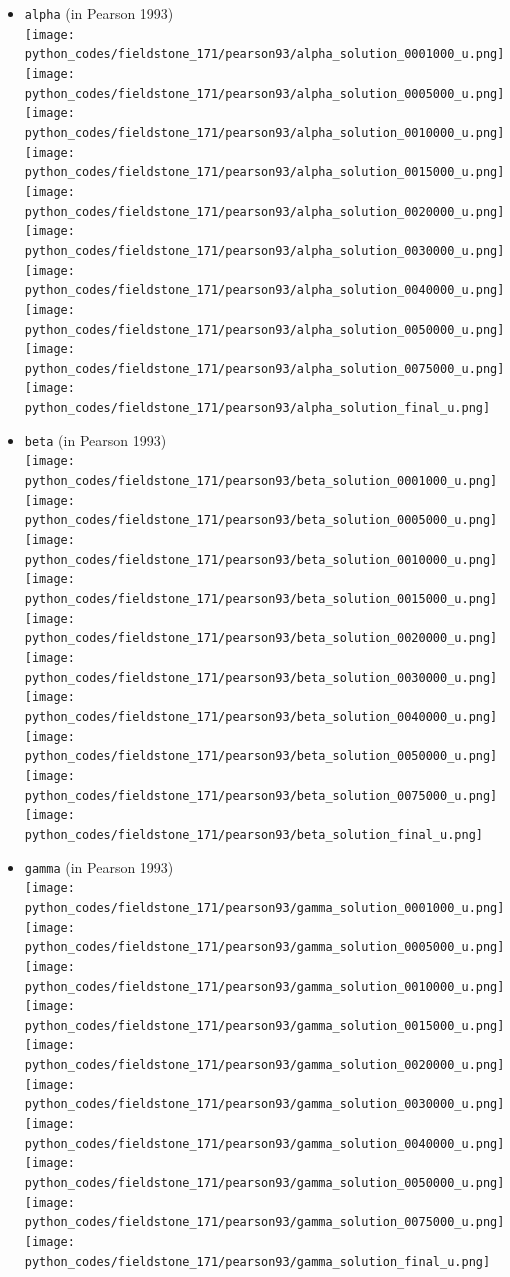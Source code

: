 \begin{itemize}
\item {\tt alpha} (in Pearson 1993)\\
\texttt{[image: python\_codes/fieldstone\_171/pearson93/alpha\_solution\_0001000\_u.png]}
\texttt{[image: python\_codes/fieldstone\_171/pearson93/alpha\_solution\_0005000\_u.png]}
\texttt{[image: python\_codes/fieldstone\_171/pearson93/alpha\_solution\_0010000\_u.png]}
\texttt{[image: python\_codes/fieldstone\_171/pearson93/alpha\_solution\_0015000\_u.png]}
\texttt{[image: python\_codes/fieldstone\_171/pearson93/alpha\_solution\_0020000\_u.png]}
\texttt{[image: python\_codes/fieldstone\_171/pearson93/alpha\_solution\_0030000\_u.png]}
\texttt{[image: python\_codes/fieldstone\_171/pearson93/alpha\_solution\_0040000\_u.png]}
\texttt{[image: python\_codes/fieldstone\_171/pearson93/alpha\_solution\_0050000\_u.png]}
\texttt{[image: python\_codes/fieldstone\_171/pearson93/alpha\_solution\_0075000\_u.png]}
\texttt{[image: python\_codes/fieldstone\_171/pearson93/alpha\_solution\_final\_u.png]}
\item {\tt beta} (in Pearson 1993)\\
\texttt{[image: python\_codes/fieldstone\_171/pearson93/beta\_solution\_0001000\_u.png]}
\texttt{[image: python\_codes/fieldstone\_171/pearson93/beta\_solution\_0005000\_u.png]}
\texttt{[image: python\_codes/fieldstone\_171/pearson93/beta\_solution\_0010000\_u.png]}
\texttt{[image: python\_codes/fieldstone\_171/pearson93/beta\_solution\_0015000\_u.png]}
\texttt{[image: python\_codes/fieldstone\_171/pearson93/beta\_solution\_0020000\_u.png]}
\texttt{[image: python\_codes/fieldstone\_171/pearson93/beta\_solution\_0030000\_u.png]}
\texttt{[image: python\_codes/fieldstone\_171/pearson93/beta\_solution\_0040000\_u.png]}
\texttt{[image: python\_codes/fieldstone\_171/pearson93/beta\_solution\_0050000\_u.png]}
\texttt{[image: python\_codes/fieldstone\_171/pearson93/beta\_solution\_0075000\_u.png]}
\texttt{[image: python\_codes/fieldstone\_171/pearson93/beta\_solution\_final\_u.png]}

\item {\tt gamma} (in Pearson 1993)\\
\texttt{[image: python\_codes/fieldstone\_171/pearson93/gamma\_solution\_0001000\_u.png]}
\texttt{[image: python\_codes/fieldstone\_171/pearson93/gamma\_solution\_0005000\_u.png]}
\texttt{[image: python\_codes/fieldstone\_171/pearson93/gamma\_solution\_0010000\_u.png]}
\texttt{[image: python\_codes/fieldstone\_171/pearson93/gamma\_solution\_0015000\_u.png]}
\texttt{[image: python\_codes/fieldstone\_171/pearson93/gamma\_solution\_0020000\_u.png]}
\texttt{[image: python\_codes/fieldstone\_171/pearson93/gamma\_solution\_0030000\_u.png]}
\texttt{[image: python\_codes/fieldstone\_171/pearson93/gamma\_solution\_0040000\_u.png]}
\texttt{[image: python\_codes/fieldstone\_171/pearson93/gamma\_solution\_0050000\_u.png]}
\texttt{[image: python\_codes/fieldstone\_171/pearson93/gamma\_solution\_0075000\_u.png]}
\texttt{[image: python\_codes/fieldstone\_171/pearson93/gamma\_solution\_final\_u.png]}



\end{itemize}

